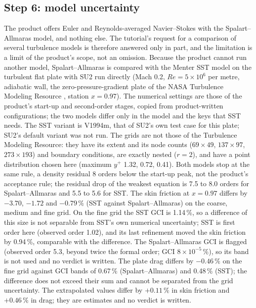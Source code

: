 \documentclass[11pt,a4paper]{article}
\begin{document}
\subsection{Step 6: model uncertainty}
\label{sec:model}

The product offers Euler and Reynolds-averaged Navier--Stokes with the Spalart--Allmaras model, and nothing else.
The tutorial's request for a comparison of several turbulence models is therefore answered only in part, and the
limitation is a limit of the product's scope, not an omission.
Because the product cannot run another model, Spalart--Allmaras is compared with the Menter SST model on the turbulent flat plate with SU2 run directly (Mach 0.2, $Re=5\times10^{6}$ per metre, adiabatic wall,
the zero-pressure-gradient plate of the NASA Turbulence Modeling Resource \citep{tmr}, station $x=0.97$).
The numerical settings are those of the product's start-up and second-order stages, copied from product-written configurations; the two models differ only in the model and the keys that SST needs.
The SST variant is V1994m, that of SU2's own test case for this plate; SU2's default variant was not run.
The grids are not those of the Turbulence Modeling Resource: they have its extent and its node counts ($69\times49$, $137\times97$, $273\times193$) and boundary conditions, are exactly nested ($r=2$), and have a point distribution chosen here
(maximum $y^+$ 1.32, 0.72, 0.41).
Both models stop at the same rule, a density residual 8 orders below the start-up peak, not the product's acceptance rule; the residual drop of the weakest equation is 7.5 to 8.0 orders for Spalart--Allmaras and 5.5 to 5.6 for SST.
The skin friction at $x=0.97$ differs by $-3.70$, $-1.72$ and $-0.79\,\%$ (SST against Spalart--Allmaras) on the coarse, medium and fine grid.
On the fine grid the SST GCI is 1.14\,\%, so a difference of this size is not separable from SST's own numerical uncertainty; SST is first order here (observed order 1.02), and its last refinement moved the skin friction by 0.94\,\%, comparable with the difference.
The Spalart--Allmaras GCI is flagged (observed order 5.3, beyond twice the formal order; GCI $8\times10^{-5}\,\%$), so its band is not used and no verdict is written.
The plate drag differs by $-0.46\,\%$ on the fine grid against GCI bands of 0.67\,\% (Spalart--Allmaras) and 0.48\,\% (SST); the difference does not exceed their sum and cannot be separated from the grid uncertainty.
The extrapolated values differ by $+0.11\,\%$ in skin friction and $+0.46\,\%$ in drag; they are estimates and no verdict is written.
\end{document}
